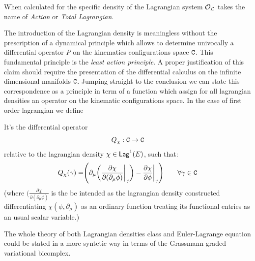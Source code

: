 \documentclass[Main]{subfiles}
\begin{document}
	\begin{notationfix}
		When calculated for the specific density of the Lagrangian system $\mathcal{O}_{\mathcal{L}}$ takes the name of \emph{Action} or \emph{Total Lagrangian}. 
	\end{notationfix}

	The introduction of the Lagrangian density is meaningless without the prescription of a dynamical principle which allows to determine univocally a differential operator $P$ on the kinematics configurations space $\mathtt{C}$.
	This fundamental principle is the \emph{least action principle}.
	A proper justification of this claim should require the presentation of the differential calculus on the infinite dimensional manifolds $\mathtt{C}$. 
	Jumping straight to the conclusion we can state this correspondence as a principle  in term of a function which assign for all lagrangian densities an operator on the kinematic configurations space. In the case of first order lagrangian we define
	\begin{definition}
		It's the differential operator
		\begin{displaymath}
			Q_\chi : \mathtt{C} \rightarrow \mathtt{C}
		\end{displaymath}
		relative to the lagrangian density $\chi \in \mathsf{Lag}^1(E)$, such that:
		\begin{equation}
			Q_\chi (\gamma) = \Biggr( \partial_\mu \biggr( \frac{\partial \chi}{\partial(\partial_\mu \phi)} \biggr\vert_\gamma \biggr) - \frac{\partial \chi}{\partial \phi}\biggr\vert_\gamma \Biggr) \qquad \forall \gamma \in \mathtt{C}
		\end{equation}
		(where 	$\biggr( \frac{\partial \chi}{\partial(\partial_\mu \phi)}$ is the be intended as the lagrangian density constructed differentiating $\chi(\phi, \partial_\mu)$ as an ordinary function treating its functional entries as an usual scalar variable.)
	\end{definition}
	\begin{observation}
		
	\end{observation}
	
	\begin{observation}
		The whole theory of both Lagrangian densities class and Euler-Lagrange equation could be stated in a more syntetic way in terms of the Grassmann-graded variational bicomplex.\cite{Giachetta2009}\cite{Sardanashvily}
	\end{observation}
	
		
\end{document}
